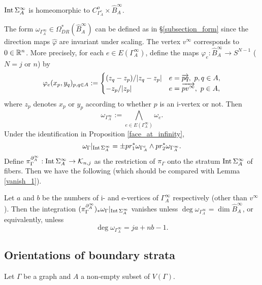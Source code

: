 \begin{prop}\label{face_at_infinity}
$\mathrm{Int}\, \Sigma^{\infty}_A$ is homeomorphic to $C^o_{\Gamma^c_A} \times \hat{B}^{\infty}_A$.
\end{prop}


The form $\omega_{\Gamma^{\infty}_A} \in \Omega^*_{DR}(\hat{B}^{\infty}_A)$ can be defined as in \S \ref{subsection_form}
since the direction maps $\hat{\varphi}$ are invariant under scaling.
The vertex $v^{\infty}$ corresponds to $0 \in \mathbb{R}^n$.
More precisely, for each $e \in E(\Gamma^{\infty}_A)$, define the maps $\varphi_e : \hat{B}^{\infty}_A \to S^{N-1}$
($N=j$ or $n$) by
\[
 \varphi_e (x_p ,y_q )_{p,q \in A} :=
 \begin{cases}
  (z_q -z_p ) / \abs{z_q -z_p} & e = \overrightarrow{pq},\ p,q \in A, \\
  -z_p / \abs{z_p}             & e = \overrightarrow{pv^{\infty}} ,\ p \in A,
 \end{cases}
\]
where $z_p$ denotes $x_p$ or $y_p$ according to whether $p$ is an i-vertex or not.
Then
\[
 \omega_{\Gamma^{\infty}_A} := \bigwedge_{e \in E(\Gamma^{\infty}_A )} \omega_e .
\]
Under the identification in Proposition \ref{face_at_infinity},
\[
 \omega_{\Gamma}|_{\mathrm{Int}\, \Sigma^{\infty}_A}=\pm pr^*_1 \omega_{\Gamma^c_A}\wedge pr^*_2 \omega_{\Gamma^{\infty}_A}.
\]
Define $\pi^{\partial^{\infty}_A}_{\Gamma} : \mathrm{Int}\, \Sigma^{\infty}_A \to \mathcal{K}_{n ,j}$ as the restriction of $\pi_{\Gamma}$
onto the stratum $\mathrm{Int}\, \Sigma^{\infty}_A$ of fibers.
Then we have the following (which should be compared with Lemma \ref{vanish_1}).


\begin{lem}\label{vanish_infty}
Let $a$ and $b$ be the numbers of i- and e-vertices of $\Gamma^{\infty}_A$ respectively (other than $v^{\infty}$).
Then the integration $(\pi^{\partial^{\infty}_A}_{\Gamma})_* \omega_{\Gamma}|_{\mathrm{Int}\, \Sigma^{\infty}_A}$ vanishes unless
$\deg \omega_{\Gamma^{\infty}_A} = \dim \hat{B}^{\infty}_A$, or equivalently, unless
\[
 \deg \omega_{\Gamma^{\infty}_A} = ja+nb-1.
\]
\end{lem}





\subsection{Orientations of boundary strata}\label{subsec_orientation}


Let $\Gamma$ be a graph and $A$ a non-empty subset of $V(\Gamma )$.


